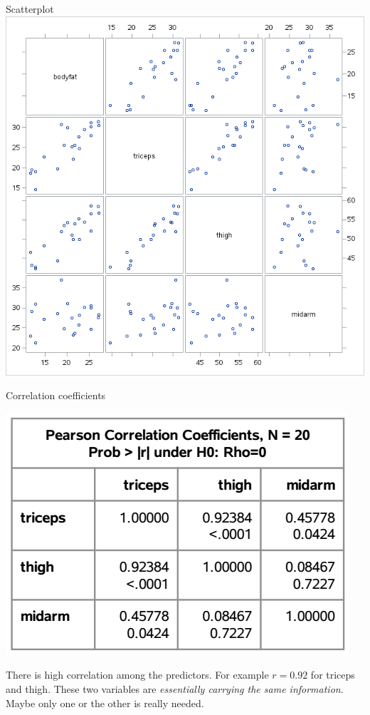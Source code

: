 \documentclass{beamer}
\begin{document}
\begin{frame}{Scatterplot}
\centering\includegraphics[scale=0.45]{plots/scatterplot}
\end{frame}

\begin{frame}{Correlation coefficients}
\begin{center}
\includegraphics[scale=0.3]{plots/corr-matrix}
\end{center}
\pause There is high correlation among the predictors. \pause For example
$r = 0.92$ for triceps and thigh. These two variables are \textit{essentially
carrying the same information}. \pause Maybe only one or the other is really needed.
\end{frame}
\end{document}
